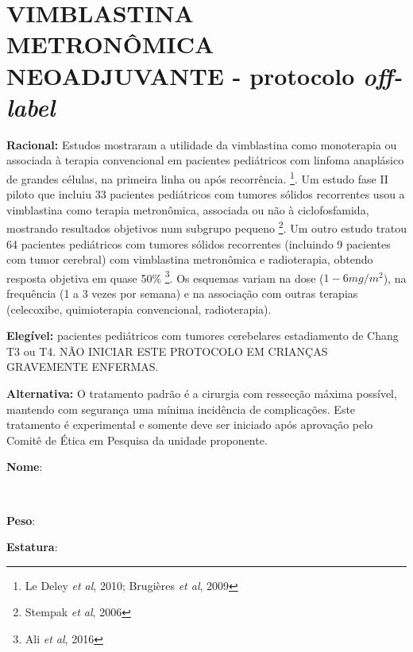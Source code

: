 \documentclass[11pt,a4paper,oldfontcommands]{memoir}
\def\entrywithlabel[#1]#2{\parbox{#1}{{\small #2:} \hrulefill}}
\begin{document}
\section{VIMBLASTINA METRONÔMICA NEOADJUVANTE - protocolo \textit{off-label}}
{\let\thefootnote\relax{}}
\textbf{Racional:} Estudos mostraram a utilidade da vimblastina como monoterapia ou associada à terapia convencional em pacientes pediátricos com linfoma anaplásico de grandes células, na primeira linha ou após recorrência.  \footnote{Le Deley \textit{et al}, 2010; Brugières \textit{et al}, 2009}. Um estudo fase II piloto que incluiu 33 pacientes pediátricos com tumores sólidos recorrentes usou a vimblastina como terapia metronômica, associada ou não à ciclofosfamida, mostrando resultados objetivos num subgrupo pequeno \footnote{Stempak \textit{et al}, 2006}. Um outro estudo tratou 64 pacientes pediátricos com tumores sólidos recorrentes (incluindo 9 pacientes com tumor cerebral) com vimblastina metronômica e radioterapia, obtendo resposta objetiva em quase 50\% \footnote{Ali \textit{et al}, 2016}. Os esquemas variam na dose ($1-6 mg/m^2$), na frequência (1 a 3 vezes por semana) e na associação com outras terapias (celecoxibe, quimioterapia convencional, radioterapia). 

\textbf{Elegível:} pacientes pediátricos com tumores cerebelares estadiamento de Chang T3 ou T4. NÃO INICIAR ESTE PROTOCOLO EM CRIANÇAS GRAVEMENTE ENFERMAS.

\textbf{Alternativa:}  O tratamento padrão é a cirurgia com ressecção máxima possível, mantendo com segurança uma mínima incidência de complicações. Este tratamento é experimental e somente deve ser iniciado após aprovação pelo Comitê de Ética em Pesquisa da unidade proponente.
\\[0.4cm]
\entrywithlabel[1\hsize]{\textbf{Nome}}\hfill
\\[0.3cm]
\entrywithlabel[.45\hsize]{\textbf{Peso}}\hfill  \entrywithlabel[.45\hsize]{\textbf{Estatura}}
\end{document}
